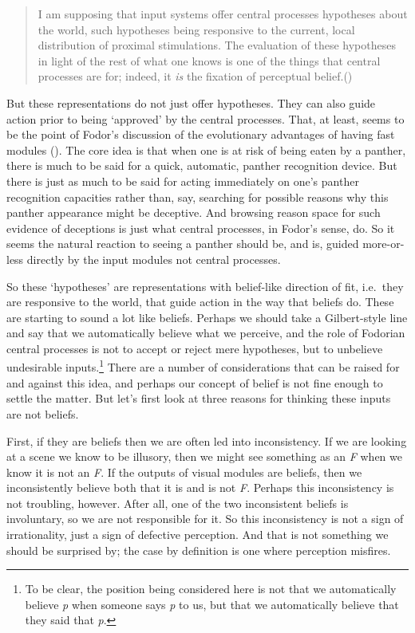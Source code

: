 \documentclass[
  10pt,
  letterpaper,
  DIV=11,
  numbers=noendperiod,
  twoside]{scrartcl}
\begin{document}
\begin{quote}
I am supposing that input systems offer central processes hypotheses
about the world, such hypotheses being responsive to the current, local
distribution of proximal stimulations. The evaluation of these
hypotheses in light of the rest of what one knows is one of the things
that central processes are for; indeed, it \emph{is} the fixation of
perceptual belief.()
\end{quote}

But these representations do not just offer hypotheses. They can also
guide action prior to being `approved' by the central processes. That,
at least, seems to be the point of Fodor's discussion of the
evolutionary advantages of having fast modules
(). The core idea is that
when one is at risk of being eaten by a panther, there is much to be
said for a quick, automatic, panther recognition device. But there is
just as much to be said for acting immediately on one's panther
recognition capacities rather than, say, searching for possible reasons
why this panther appearance might be deceptive. And browsing reason
space for such evidence of deceptions is just what central processes, in
Fodor's sense, do. So it seems the natural reaction to seeing a panther
should be, and is, guided more-or-less directly by the input modules not
central processes.

So these `hypotheses' are representations with belief-like direction of
fit, i.e.~they are responsive to the world, that guide action in the way
that beliefs do. These are starting to sound a lot like beliefs. Perhaps
we should take a Gilbert-style line and say that we automatically
believe what we perceive, and the role of Fodorian central processes is
not to accept or reject mere hypotheses, but to unbelieve undesirable
inputs.\footnote{To be clear, the position being considered here is not
  that we automatically believe \emph{p} when someone says \emph{p} to
  us, but that we automatically believe that they said that \emph{p}.}
There are a number of considerations that can be raised for and against
this idea, and perhaps our concept of belief is not fine enough to
settle the matter. But let's first look at three reasons for thinking
these inputs are not beliefs.

First, if they are beliefs then we are often led into inconsistency. If
we are looking at a scene we know to be illusory, then we might see
something as an \emph{F} when we know it is not an \emph{F}. If the
outputs of visual modules are beliefs, then we inconsistently believe
both that it is and is not \emph{F}. Perhaps this inconsistency is not
troubling, however. After all, one of the two inconsistent beliefs is
involuntary, so we are not responsible for it. So this inconsistency is
not a sign of irrationality, just a sign of defective perception. And
that is not something we should be surprised by; the case by definition
is one where perception misfires.
\end{document}
